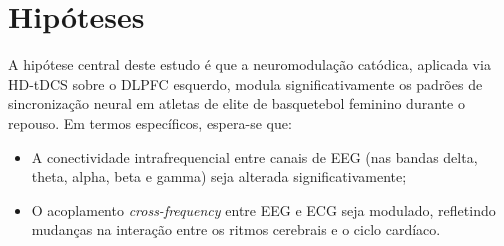 \chapter{Hipóteses}
\label{chap:hipoteses}
A hipótese central deste estudo é que a neuromodulação catódica, aplicada via HD-tDCS sobre o DLPFC esquerdo, modula significativamente os padrões de sincronização neural em atletas de elite de basquetebol feminino durante o repouso. Em termos específicos, espera-se que:
\begin{itemize}
    \item A conectividade intrafrequencial entre canais de EEG (nas bandas delta, theta, alpha, beta e gamma) seja alterada significativamente;
    \item O acoplamento \textit{cross-frequency} entre EEG e ECG seja modulado, refletindo mudanças na interação entre os ritmos cerebrais e o ciclo cardíaco.
\end{itemize}
